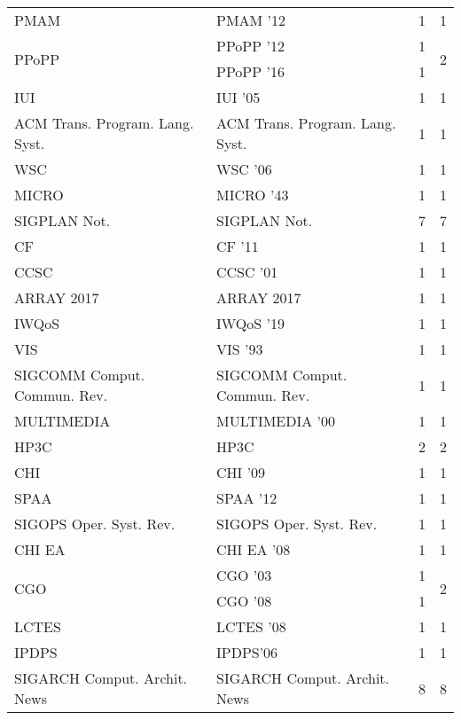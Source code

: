 \begin{table*}[t]
\begin{tabular}{llrr}
\multirow{1}{*}{PMAM } & PMAM '12 & 1 & \multirow{1}{*}{1}\\
\multirow{2}{*}{PPoPP } & PPoPP '12 & 1 & \multirow{2}{*}{2}\\
& PPoPP '16 & 1 &\\
\multirow{1}{*}{IUI } & IUI '05 & 1 & \multirow{1}{*}{1}\\
\multirow{1}{*}{ACM Trans. Program. Lang. Syst.} & ACM Trans. Program. Lang. Syst. & 1 & \multirow{1}{*}{1}\\
\multirow{1}{*}{WSC } & WSC '06 & 1 & \multirow{1}{*}{1}\\
\multirow{1}{*}{MICRO } & MICRO '43 & 1 & \multirow{1}{*}{1}\\
\multirow{1}{*}{SIGPLAN Not.} & SIGPLAN Not. & 7 & \multirow{1}{*}{7}\\
\multirow{1}{*}{CF } & CF '11 & 1 & \multirow{1}{*}{1}\\
\multirow{1}{*}{CCSC } & CCSC '01 & 1 & \multirow{1}{*}{1}\\
\multirow{1}{*}{ARRAY 2017} & ARRAY 2017 & 1 & \multirow{1}{*}{1}\\
\multirow{1}{*}{IWQoS } & IWQoS '19 & 1 & \multirow{1}{*}{1}\\
\multirow{1}{*}{VIS } & VIS '93 & 1 & \multirow{1}{*}{1}\\
\multirow{1}{*}{SIGCOMM Comput. Commun. Rev.} & SIGCOMM Comput. Commun. Rev. & 1 & \multirow{1}{*}{1}\\
\multirow{1}{*}{MULTIMEDIA } & MULTIMEDIA '00 & 1 & \multirow{1}{*}{1}\\
\multirow{1}{*}{HP3C} & HP3C & 2 & \multirow{1}{*}{2}\\
\multirow{1}{*}{CHI } & CHI '09 & 1 & \multirow{1}{*}{1}\\
\multirow{1}{*}{SPAA } & SPAA '12 & 1 & \multirow{1}{*}{1}\\
\multirow{1}{*}{SIGOPS Oper. Syst. Rev.} & SIGOPS Oper. Syst. Rev. & 1 & \multirow{1}{*}{1}\\
\multirow{1}{*}{CHI EA } & CHI EA '08 & 1 & \multirow{1}{*}{1}\\
\multirow{2}{*}{CGO } & CGO '03 & 1 & \multirow{2}{*}{2}\\
& CGO '08 & 1 &\\
\multirow{1}{*}{LCTES } & LCTES '08 & 1 & \multirow{1}{*}{1}\\
\multirow{1}{*}{IPDPS} & IPDPS'06 & 1 & \multirow{1}{*}{1}\\
\multirow{1}{*}{SIGARCH Comput. Archit. News} & SIGARCH Comput. Archit. News & 8 & \multirow{1}{*}{8}\\

\end{tabular}
\end{table*}
